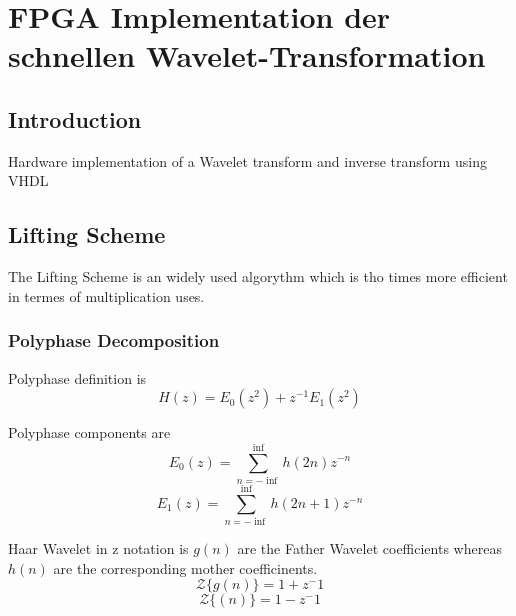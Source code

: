 %
%
%
\chapter{FPGA Implementation der schnellen Wavelet-Transformation\label{chapter:fpga}}
\begin{refsection}

\section{Introduction}

Hardware implementation of a Wavelet transform and inverse transform using VHDL


\section{Lifting Scheme}

The Lifting Scheme is an widely used algorythm which is tho times more efficient in termes of multiplication uses. 


\subsection{Polyphase Decomposition}


Polyphase definition is
\begin{equation}
H(z)=E_{0}(z^2)+z^{−1} E_1(z^2)
\end{equation}

Polyphase components are
\begin{equation}
E_0(z) = \sum_{n=-\inf}^\inf h(2n)z^{-n}
\end{equation}
\begin{equation}
E_1(z) = \sum_{n=-\inf}^\inf h(2n+1)z^{-n}
\end{equation}

Haar Wavelet in z notation is
$g(n)$ are the Father Wavelet coefficients whereas $h(n)$ are the corresponding mother coefficinents. 
\begin{equation}
{\mathcal {Z}} \{g(n)\} = 1 + z^-1
\end{equation}
\begin{equation}
{\mathcal {Z}} \{(n)\} = 1 - z^-1
\end{equation}



\end{refsection}
